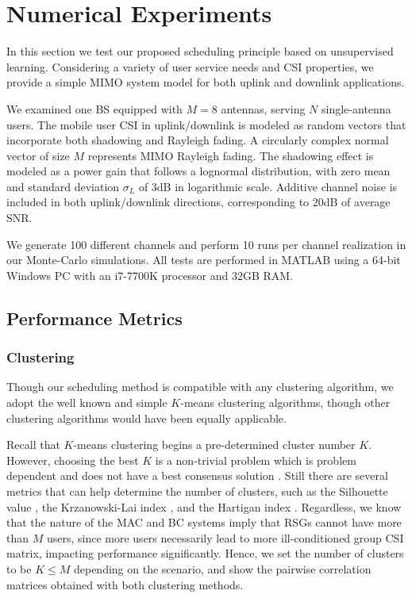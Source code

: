 \section{Numerical Experiments}\label{usch:sec:sim}
In this section we test our proposed scheduling principle based on unsupervised learning. 
Considering a variety of user service needs and CSI properties, we provide a simple MIMO system model for both uplink and downlink applications. 


We examined one BS equipped with $M=8$ antennas, serving $N$ single-antenna users. 
The mobile user CSI in uplink/downlink is modeled as random vectors that incorporate both shadowing
and Rayleigh fading. 
A circularly complex normal vector of size $M$ represents MIMO Rayleigh fading.
The shadowing effect is modeled as a power gain that follows a lognormal distribution, with zero mean and standard deviation $\sigma_L$ of 3dB in logarithmic scale. 
Additive channel noise is included in both uplink/downlink directions, corresponding to 20dB of average SNR. 

We generate 100 different channels and perform 10 runs per channel realization in our Monte-Carlo simulations. 
All tests are performed in MATLAB using a 64-bit Windows PC  with an i7-7700K processor and 32GB RAM.

\subsection{Performance Metrics}
\subsubsection{Clustering}
Though our scheduling method is compatible with any clustering algorithm, we adopt the well known and simple $K$-means clustering algorithms, though other clustering algorithms would have been equally applicable.

Recall that $K$-means clustering begins a pre-determined cluster number $K$. 
However, choosing the best $K$ is a non-trivial problem which is problem dependent and does not have a best consensus solution \cite{gap}.
Still there are several metrics that can help determine the number of clusters, such as the Silhouette value \cite{silhouette}, the Krzanowski-Lai index \cite{Lai}, and the Hartigan index \cite{Hartigan}. 
Regardless, we know that the nature of the MAC and BC systems imply that RSGs cannot have more than $M$ users, since more users necessarily lead to more ill-conditioned group CSI matrix, impacting performance significantly. Hence, we set the number of clusters to be $K\leq M$ depending on the scenario, and show the pairwise correlation matrices obtained with both clustering methods. 


